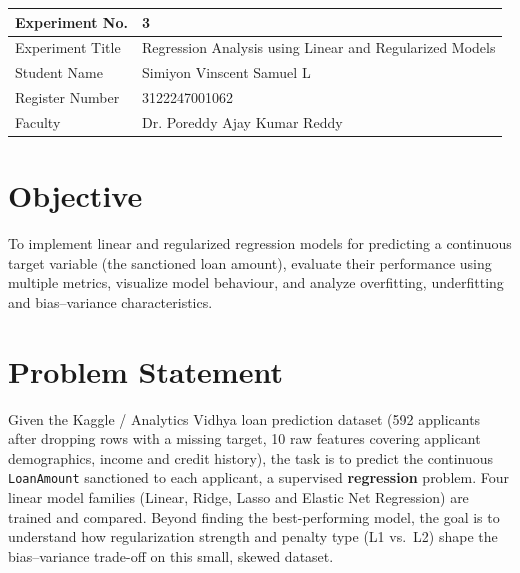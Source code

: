 \documentclass[12pt,a4paper]{article}
\begin{document}
\begin{tabular}{|p{4cm}|p{11cm}|}
\hline
Experiment No. & 3 \\ \hline
Experiment Title & Regression Analysis using Linear and Regularized Models\footnotemark\\ \hline
Student Name & Simiyon Vinscent Samuel L \\ \hline
Register Number & 3122247001062 \\ \hline
Faculty & Dr. Poreddy Ajay Kumar Reddy \\ \hline
\end{tabular}

\section{Objective}
To implement linear and regularized regression models for predicting a continuous target
variable (the sanctioned loan amount), evaluate their performance using multiple metrics,
visualize model behaviour, and analyze overfitting, underfitting and bias--variance
characteristics.

\section{Problem Statement}
Given the Kaggle / Analytics Vidhya loan prediction dataset (592 applicants after dropping
rows with a missing target, 10 raw features covering applicant demographics, income and
credit history), the task is to predict the continuous \texttt{LoanAmount} sanctioned to
each applicant, a supervised \textbf{regression} problem. Four linear model families
(Linear, Ridge, Lasso and Elastic Net Regression) are trained and compared. Beyond finding
the best-performing model, the goal is to understand how regularization strength and
penalty type (L1 vs.\ L2) shape the bias--variance trade-off on this small, skewed dataset.
\end{document}
